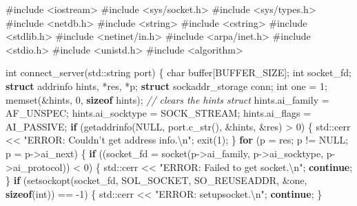 \documentclass[]{article}
\newenvironment{Shaded}{}{}
\newcommand{\BuiltInTok}[1]{#1}
\newcommand{\CommentTok}[1]{\textcolor[rgb]{0.38,0.63,0.69}{\textit{#1}}}
\newcommand{\ControlFlowTok}[1]{\textcolor[rgb]{0.00,0.44,0.13}{\textbf{#1}}}
\newcommand{\DataTypeTok}[1]{\textcolor[rgb]{0.56,0.13,0.00}{#1}}
\newcommand{\DecValTok}[1]{\textcolor[rgb]{0.25,0.63,0.44}{#1}}
\newcommand{\ImportTok}[1]{#1}
\newcommand{\KeywordTok}[1]{\textcolor[rgb]{0.00,0.44,0.13}{\textbf{#1}}}
\newcommand{\NormalTok}[1]{#1}
\newcommand{\PreprocessorTok}[1]{\textcolor[rgb]{0.74,0.48,0.00}{#1}}
\newcommand{\SpecialCharTok}[1]{\textcolor[rgb]{0.25,0.44,0.63}{#1}}
\newcommand{\StringTok}[1]{\textcolor[rgb]{0.25,0.44,0.63}{#1}}
\begin{document}
\begin{Shaded}
\begin{Highlighting}[]
\PreprocessorTok{#include }\ImportTok{<iostream>}
\PreprocessorTok{#include }\ImportTok{<sys/socket.h>}
\PreprocessorTok{#include }\ImportTok{<sys/types.h>}
\PreprocessorTok{#include }\ImportTok{<netdb.h>}
\PreprocessorTok{#include }\ImportTok{<string>}
\PreprocessorTok{#include }\ImportTok{<cstring>}
\PreprocessorTok{#include }\ImportTok{<stdlib.h>}
\PreprocessorTok{#include }\ImportTok{<netinet/in.h>}
\PreprocessorTok{#include }\ImportTok{<arpa/inet.h>}
\PreprocessorTok{#include }\ImportTok{<stdio.h>}
\PreprocessorTok{#include }\ImportTok{<unistd.h>}
\PreprocessorTok{#include }\ImportTok{<algorithm>}

\DataTypeTok{int}\NormalTok{ connect_server(}\BuiltInTok{std::}\NormalTok{string port) \{}
    \DataTypeTok{char}\NormalTok{ buffer[BUFFER_SIZE];}
    \DataTypeTok{int}\NormalTok{ socket_fd;}
    \KeywordTok{struct}\NormalTok{ addrinfo hints, *res, *p;}
    \KeywordTok{struct}\NormalTok{ sockaddr_storage conn;}
    \DataTypeTok{int}\NormalTok{ one = }\DecValTok{1}\NormalTok{;}
\NormalTok{    memset(&hints, }\DecValTok{0}\NormalTok{, }\KeywordTok{sizeof}\NormalTok{ hints); }\CommentTok{// clears the hints struct}
\NormalTok{    hints.ai_family = AF_UNSPEC;}
\NormalTok{    hints.ai_socktype = SOCK_STREAM;}
\NormalTok{    hints.ai_flags = AI_PASSIVE;}
    \ControlFlowTok{if}\NormalTok{ (getaddrinfo(NULL, port.c_str(), &hints, &res) > }\DecValTok{0}\NormalTok{) \{}
        \BuiltInTok{std::}\NormalTok{cerr << }\StringTok{"ERROR: Couldn't get address info.}\SpecialCharTok{\textbackslash{}n}\StringTok{"}\NormalTok{;}
\NormalTok{        exit(}\DecValTok{1}\NormalTok{);}
\NormalTok{    \}}
    \ControlFlowTok{for}\NormalTok{ (p = res; p != NULL; p = p->ai_next) \{}
        \ControlFlowTok{if}\NormalTok{ ((socket_fd = socket(p->ai_family, p->ai_socktype, p->ai_protocol)) < }\DecValTok{0}\NormalTok{) \{}
            \BuiltInTok{std::}\NormalTok{cerr << }\StringTok{"ERROR: Failed to get socket.}\SpecialCharTok{\textbackslash{}n}\StringTok{"}\NormalTok{;}
            \ControlFlowTok{continue}\NormalTok{;}
\NormalTok{        \}}
        \ControlFlowTok{if}\NormalTok{ (setsockopt(socket_fd, SOL_SOCKET, SO_REUSEADDR, &one, }\KeywordTok{sizeof}\NormalTok{(}\DataTypeTok{int}\NormalTok{)) == }\DecValTok{-1}\NormalTok{) \{}
            \BuiltInTok{std::}\NormalTok{cerr << }\StringTok{"ERROR: setupsocket.}\SpecialCharTok{\textbackslash{}n}\StringTok{"}\NormalTok{;}
            \ControlFlowTok{continue}\NormalTok{;}
\NormalTok{        \}}

\end{Highlighting}
\end{Shaded}
\end{document}
